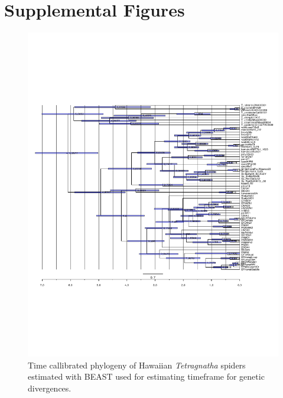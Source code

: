 \documentclass[12pt]{article}
\begin{document}



\clearpage

\section{Supplemental Figures}

\begin{figure}[!hp]
  \centering
  \includegraphics[scale=0.8]{figSupp_tetragDate.pdf}
  \caption{Time callibrated phylogeny of Hawaiian {\it Tetragnatha}
    spiders estimated with BEAST \citep{beast} used for estimating
    timeframe for genetic divergences.}
  \label{figSupp:tegragDate}
\end{figure}
\end{document}
